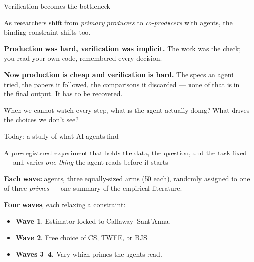 \documentclass[aspectratio=169,12pt,t]{beamer}
\begin{document}
\begin{frame}{Verification becomes the bottleneck}
\vspace{0.3cm}

As researchers shift from \textit{primary producers} to \textit{co-producers} with agents, the binding constraint shifts too.

\vspace{0.3cm}

\textbf{Production was hard, verification was implicit.} \;The work was the check; you read your own code, remembered every decision.

\vspace{0.3cm}

\textbf{Now production is cheap and verification is hard.} \;The specs an agent tried, the papers it followed, the comparisons it discarded --- none of that is in the final output. \;It has to be recovered.

\vspace{0.4cm}

 \;When we cannot watch every step, what is the agent actually doing? \;What drives the choices we don't see?
\end{frame}


\begin{frame}{Today: a study of what AI agents find}
\vspace{0.2cm}

A pre-registered experiment that holds the data, the question, and the task fixed --- and varies \textit{one thing} the agent reads before it starts.

\vspace{0.35cm}

\textbf{Each wave:}  agents, three equally-sized arms (50 each), randomly assigned to one of three \textit{primes} --- one summary of the empirical literature.

\vspace{0.3cm}

\textbf{Four waves}, each relaxing a constraint:
\begin{itemize}\small\setlength\itemsep{1pt}
  \item \textbf{Wave 1.} \;Estimator locked to Callaway--Sant'Anna.
  \item \textbf{Wave 2.} \;Free choice of CS, TWFE, or BJS.
  \item \textbf{Waves 3--4.} \;Vary which primes the agents read.
\end{itemize}
\end{frame}
\end{document}
